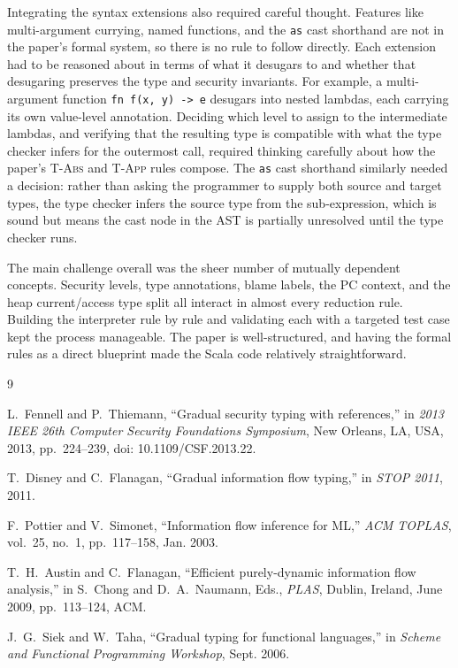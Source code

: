 \documentclass[11pt,a4paper]{article}
\begin{document}
Integrating the syntax extensions also required careful thought. Features like
multi-argument currying, named functions, and the \texttt{as} cast shorthand are not in the
paper's formal system, so there is no rule to follow directly. Each extension had to be
reasoned about in terms of what it desugars to and whether that desugaring preserves the
type and security invariants. For example, a multi-argument function \texttt{fn f(x, y) -> e}
desugars into nested lambdas, each carrying its own value-level annotation. Deciding which
level to assign to the intermediate lambdas, and verifying that the resulting type is
compatible with what the type checker infers for the outermost call, required thinking
carefully about how the paper's \textsc{T-Abs} and \textsc{T-App} rules compose. The
\texttt{as} cast shorthand similarly needed a decision: rather than asking the programmer to
supply both source and target types, the type checker infers the source type from the
sub-expression, which is sound but means the cast node in the AST is partially unresolved
until the type checker runs.

The main challenge overall was the sheer number of mutually dependent concepts. Security
levels, type annotations, blame labels, the PC context, and the heap current/access type
split all interact in almost every reduction rule. Building the interpreter rule by rule and
validating each with a targeted test case kept the process manageable. The paper is
well-structured, and having the formal rules as a direct blueprint made the Scala code
relatively straightforward.

\begin{thebibliography}{9}

L.~Fennell and P.~Thiemann,
``Gradual security typing with references,''
in \emph{2013 IEEE 26th Computer Security Foundations Symposium},
New Orleans, LA, USA, 2013, pp.~224--239, doi: 10.1109/CSF.2013.22.

T.~Disney and C.~Flanagan,
``Gradual information flow typing,''
in \emph{STOP 2011}, 2011.

F.~Pottier and V.~Simonet,
``Information flow inference for ML,''
\emph{ACM TOPLAS}, vol.~25, no.~1, pp.~117--158, Jan. 2003.

T.~H.~Austin and C.~Flanagan,
``Efficient purely-dynamic information flow analysis,''
in S.~Chong and D.~A.~Naumann, Eds., \emph{PLAS}, Dublin, Ireland, June 2009, pp.~113--124, ACM.

J.~G.~Siek and W.~Taha,
``Gradual typing for functional languages,''
in \emph{Scheme and Functional Programming Workshop}, Sept. 2006.

\end{thebibliography}
\end{document}
